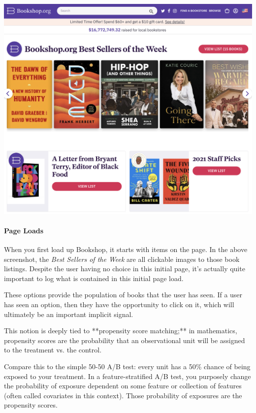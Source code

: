 \vspace{10pt}
\includegraphics[width=\textwidth-10pt]{book-text/bookshop-landingpage.png}

\paragraph{Page Loads}

When you first load up Bookshop, it starts with items on the page. In the above screenshot, the \emph{Best Sellers of the Week} are all clickable images to those book listings. Despite the user having no choice in this initial page, it's actually quite important to log what is contained in this initial page load. 

These options provide the population of books that the user has seen. If a user has seen an option, then they have the opportunity to click on it, which will ultimately be an important implicit signal. 


\vspace{10pt}
\colorbox{almond}{\parbox{\textwidth}{ This notion is deeply tied to **propensity score matching;** in mathematics, propensity scores are the probability that an observational unit will be assigned to the treatment vs. the control.
}}
\vspace{10pt}

Compare this to the simple 50-50 A/B test: every unit has a 50\% chance of being exposed to your treatment. In a feature-stratified A/B test, you purposely change the probability of exposure dependent on some feature or collection of features (often called covariates in this context). Those probability of exposures are the propensity scores. 

